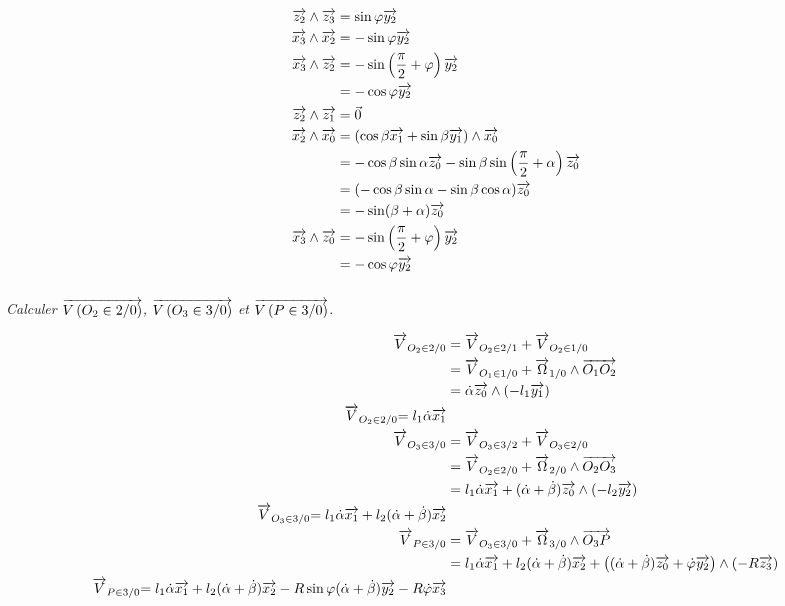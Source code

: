 \documentclass[10pt,fleqn]{article} %
\begin{document}
\begin{multicols}{2}
\begin{corrige}
\begin{align*}
\overrightarrow{z_2} \wedge \overrightarrow{z_3} &=\sin\varphi \overrightarrow{y_2}\\
\overrightarrow{x_3} \wedge\overrightarrow{x_2} &= -\sin\varphi \overrightarrow{y_2}\\
\overrightarrow{x_3} \wedge \overrightarrow{z_2}&= -\sin\left(\dfrac{\pi}{2}+\varphi\right)\overrightarrow{y_2}\\
	&=-\cos\varphi\overrightarrow{y_2}\\
\overrightarrow{z_2} \wedge \overrightarrow{z_{1}} &= \vec{0}\\
\overrightarrow{x_2} \wedge \overrightarrow{x_{0}} &= \left(\cos\beta\overrightarrow{x_{1}}+\sin\beta\overrightarrow{y_{1}}\right)\wedge\overrightarrow{x_{0}}\\
	&=-\cos\beta\sin\alpha\overrightarrow{z_0} - \sin\beta\sin\left(\dfrac{\pi}{2}+\alpha\right)\overrightarrow{z_0}\\
	&=(-\cos\beta\sin\alpha-\sin\beta\cos\alpha)\overrightarrow{z_0}\\
	&=-\sin(\beta+\alpha)\overrightarrow{z_0}\\
\overrightarrow{x_3}\wedge\overrightarrow{z_0} &= -\sin\left(\dfrac{\pi}{2}+\varphi\right)\overrightarrow{y_2}\\
	&=-\cos\varphi\overrightarrow{y_2}
\end{align*}

\end{corrige}\else\fi


\subparagraph{}
\textit{Calculer $\overrightarrow{V\left( {O_2} \in {2}/{0}\right)}$, $\overrightarrow{V\left( {O_3} \in {3}/{0}\right)}$ et $\overrightarrow{V\left( {P} \in {3}/{0}\right)}$.}
\ifprof
\begin{corrige}
\begin{align*}
\overrightarrow{V}_{O_2\in 2 / 0}&={\overrightarrow{V}_{O_2\in 2 / 1}}+\overrightarrow{V}_{O_2\in 1 / 0}\\
	&={\overrightarrow{V}_{O_1\in 1 / 0}}+\overrightarrow{\Omega}_{1 / 0}\wedge\overrightarrow{O_1 O_2}\\
	&= \dot\alpha\overrightarrow{z_0} \wedge (-l_1 \overrightarrow{y_{1}}) \\
{\overrightarrow{V}_{O_2\in 2 / 0}}{= l_1\dot\alpha\overrightarrow{x_{1}}}\\
\overrightarrow{V}_{O_3\in 3 / 0}&={\overrightarrow{V}_{O_3\in 3 / 2}}+\overrightarrow{V}_{O_3\in 2 / 0}\\
	&=\overrightarrow{V}_{O_2\in 2 / 0}+\overrightarrow{\Omega}_{2 / 0}\wedge \overrightarrow{O_2 O_3}\\
	&=l_1\dot\alpha\overrightarrow{x_{1}}+(\dot\alpha+\dot\beta)\overrightarrow{z_0}\wedge (-l_2 \overrightarrow{y_2})\\
{\overrightarrow{V}_{O_3\in 3 / 0}}{=l_1\dot\alpha\overrightarrow{x_{1}}+l_2(\dot\alpha+\dot\beta)\overrightarrow{x_2}}\\
\overrightarrow{V}_{P\in 3 / 0}&=\overrightarrow{V}_{O_3\in 3 / 0}+\overrightarrow{\Omega}_{3 / 0}\wedge\overrightarrow{O_3 P}\\	&=l_1\dot\alpha\overrightarrow{x_{1}}+l_2(\dot\alpha+\dot\beta)\overrightarrow{x_2}+ \left((\dot\alpha+\dot\beta)\overrightarrow{z_0}+\dot\varphi\overrightarrow{y_2}\right)\wedge(-R\overrightarrow{z_3})\\
{\overrightarrow{V}_{P\in 3 / 0}}{=l_1\dot\alpha\overrightarrow{x_{1}}+l_2(\dot\alpha+\dot\beta)\overrightarrow{x_2}-R\sin\varphi(\dot\alpha+\dot\beta)\overrightarrow{y_2}-R\dot\varphi\overrightarrow{x_3}}
\end{align*}
\end{corrige}\else\fi


\end{multicols}
\end{document}
